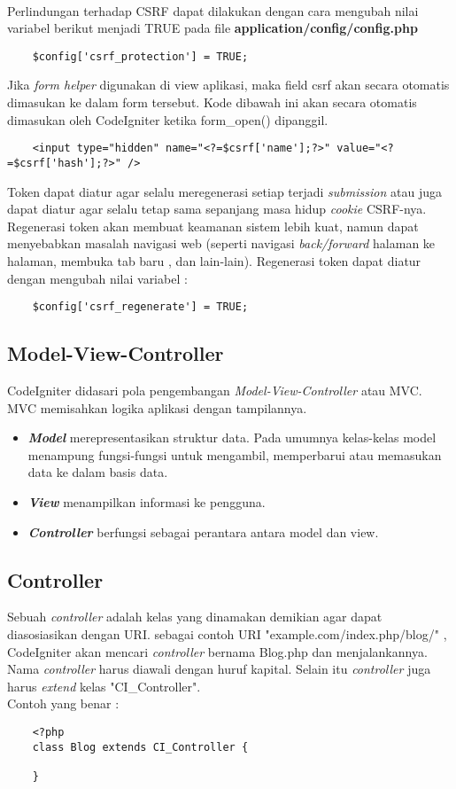 \paragraph{} Perlindungan terhadap CSRF dapat dilakukan dengan cara mengubah nilai variabel berikut menjadi TRUE pada file \textbf{application/config/config.php}
\begin{lstlisting}
	$config['csrf_protection'] = TRUE;
\end{lstlisting}
Jika \textit{form helper} digunakan di view aplikasi, maka field csrf akan secara otomatis dimasukan ke dalam form tersebut. Kode dibawah ini akan secara otomatis dimasukan oleh CodeIgniter ketika form\_open() dipanggil.
\begin{lstlisting}
	<input type="hidden" name="<?=$csrf['name'];?>" value="<?=$csrf['hash'];?>" />
\end{lstlisting}
Token dapat diatur agar selalu meregenerasi setiap terjadi \textit{submission} atau juga dapat diatur agar selalu tetap sama sepanjang masa hidup \textit{cookie} CSRF-nya. Regenerasi token akan membuat keamanan sistem lebih kuat, namun dapat menyebabkan masalah navigasi web (seperti navigasi \textit{back/forward} halaman ke halaman, membuka tab baru , dan lain-lain). Regenerasi token dapat diatur dengan mengubah nilai variabel :
\begin{lstlisting}
	$config['csrf_regenerate'] = TRUE;
\end{lstlisting}
\subsection{Model-View-Controller}
CodeIgniter didasari pola pengembangan \textit{Model-View-Controller} atau MVC. MVC memisahkan logika aplikasi dengan tampilannya.
\begin{itemize}
		\item \textbf{\textit{Model}} merepresentasikan struktur data. Pada umumnya kelas-kelas model menampung fungsi-fungsi untuk mengambil, memperbarui atau memasukan data ke dalam basis data.
		\item \textbf{\textit{View}} menampilkan informasi ke pengguna. 
		\item \textbf{\textit{Controller}} berfungsi sebagai perantara antara model dan view.
\end{itemize}

\subsection{Controller}
Sebuah \textit{controller} adalah kelas yang dinamakan demikian agar dapat diasosiasikan dengan URI.
sebagai contoh URI "example.com/index.php/blog/" , CodeIgniter akan mencari \textit{controller} bernama Blog.php dan menjalankannya. Nama \textit{controller} harus diawali dengan huruf kapital. Selain itu \textit{controller} juga harus  \textit{extend} kelas "CI\_Controller". \\
Contoh yang benar :
\begin{lstlisting}
	<?php
	class Blog extends CI_Controller {

	}
\end{lstlisting}


